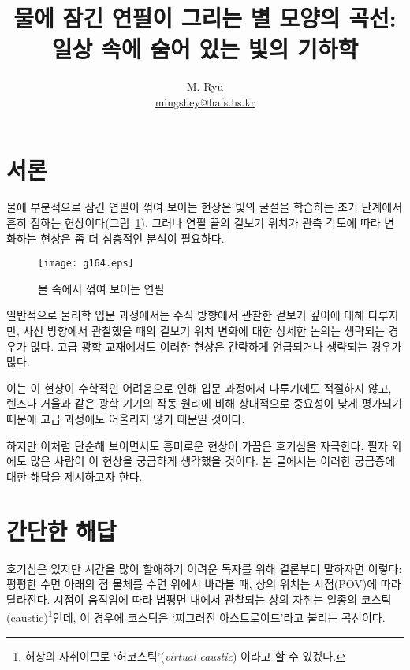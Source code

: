 \documentclass[twocolumn]{article}
\title{물에 잠긴 연필이 그리는 별 모양의 곡선:\\ 일상 속에 숨어 있는 빛의 기하학}
\author{M. Ryu \\ {\href{mailto:mingshey@hafs.hs.kr}{mingshey@hafs.hs.kr}}}
\begin{document}
\maketitle
\newcommand{\romana}{{a}}
\newcommand{\romanb}{{b}}
\newcommand{\romanA}{{A}}
\newcommand{\romanB}{{B}}
\newcommand{\greeka}{{\alpha}}
\newcommand{\greekb}{{\beta}}
\newcommand{\Aprime}{{A^{\prime}}}
\newcommand{\Bprime}{{B^{\prime}}}
\renewcommand{\figurename}{그림}
\section{서론}

물에 부분적으로 잠긴 연필이 꺾여 보이는 현상은 빛의 굴절을 학습하는 초기 단계에서 흔히 접하는 현상이다(\figurename\ \ref{fig:pencil}). 그러나 연필 끝의 겉보기 위치가 관측 각도에 따라 변화하는 현상은 좀 더 심층적인 분석이 필요하다. 

\begin{figure}[ht]
	\centering
	\texttt{[image: g164.eps]}
	\caption{물 속에서 꺾여 보이는 연필}
	\label{fig:pencil}
\end{figure}

일반적으로 물리학 입문 과정에서는 수직 방향에서 관찰한 겉보기 깊이에 대해 다루지만, 사선 방향에서 관찰했을 때의 겉보기 위치 변화에 대한 상세한 논의는 생략되는 경우가 많다. 고급 광학 교재에서도 이러한 현상은 간략하게 언급되거나 생략되는 경우가 많다. 

이는 이 현상이 수학적인 어려움으로 인해 입문 과정에서 다루기에도 적절하지 않고, 렌즈나 거울과 같은 광학 기기의 작동 원리에 비해 상대적으로 중요성이 낮게 평가되기 때문에 고급 과정에도 어울리지 않기 때문일 것이다. 

하지만 이처럼 단순해 보이면서도 흥미로운 현상이 가끔은 호기심을 자극한다. 필자 외에도 많은 사람이 이 현상을 궁금하게 생각했을 것이다. 본 글에서는 이러한 궁금증에 대한 해답을 제시하고자 한다.


\section{간단한 해답}

호기심은 있지만 시간을 많이 할애하기 어려운 독자를 위해 결론부터 말하자면 이렇다:  
평평한 수면 아래의 점 물체를 수면 위에서 바라볼 때, 상의 위치는 시점(POV)에 따라 달라진다. 
시점이 움직임에 따라 법평면 내에서 관찰되는 상의 자취는 일종의  코스틱(caustic)\footnote{허상의 
자취이므로 `허코스틱'(\emph{virtual caustic}) 이라고 할 수 있겠다.}인데, 이 경우에 
코스틱은 `찌그러진 아스트로이드'라고 불리는 곡선이다.
	
\end{document}
